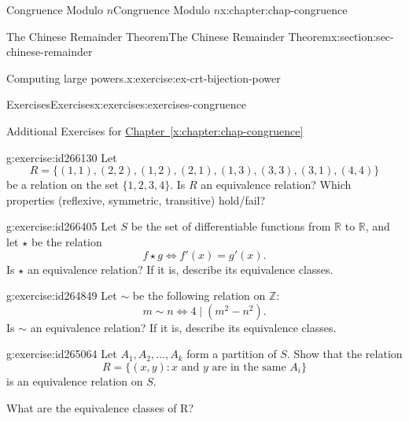 \documentclass[oneside,10pt,]{book}
\newcommand{\xreffont}{\relax}
\numberwithin{equation}{section}
\begin{document}
\begin{chapterptx}{Congruence Modulo \(n\)}{}{Congruence Modulo \(n\)}{}{}{x:chapter:chap-congruence}
\begin{sectionptx}{The Chinese Remainder Theorem}{}{The Chinese Remainder Theorem}{}{}{x:section:sec-chinese-remainder}
\begin{inlineexercise}{Computing large powers.}{x:exercise:ex-crt-bijection-power}
\end{inlineexercise}
\end{sectionptx}
%
%
\typeout{************************************************}
\typeout{************************************************}
%
\begin{exercises-section}{Exercises}{}{Exercises}{}{}{x:exercises:exercises-congruence}
\begin{introduction}{}%
Additional Exercises for \hyperref[x:chapter:chap-congruence]{Chapter~{\xreffont\ref{x:chapter:chap-congruence}}}%
\end{introduction}%
\begin{divisionexercise}{1}{}{}{g:exercise:id266130}%
Let%
\begin{equation*}
R = \{(1,1),(2,2),(1,2),(2,1),(1,3),(3,3),(3,1),(4,4)\}
\end{equation*}
be a relation on the set \(\{1,2,3,4\}\). Is \(R\) an equivalence relation? Which properties (reflexive, symmetric, transitive) hold\slash{}fail?%
\end{divisionexercise}%
\begin{divisionexercise}{2}{}{}{g:exercise:id266405}%
Let \(S\) be the set of differentiable functions from \(\mathbb{R}\) to \(\mathbb{R}\), and let \(\star\) be the relation%
\begin{equation*}
f \star g \Leftrightarrow f'(x) = g'(x)\text{.}
\end{equation*}
Is \(\star\) an equivalence relation? If it is, describe its equivalence classes.%
\end{divisionexercise}%
\begin{divisionexercise}{3}{}{}{g:exercise:id264849}%
Let \(\sim\) be the following relation on \(\mathbb{Z}\):%
\begin{equation*}
m \sim n \Leftrightarrow 4 \mid (m^2 - n^2)\text{.}
\end{equation*}
Is \(\sim\) an equivalence relation? If it is, describe its equivalence classes.%
\end{divisionexercise}%
\begin{divisionexercise}{4}{}{}{g:exercise:id265064}%
Let \(A_1, A_2, \ldots, A_k\) form a partition of \(S\). Show that the relation%
\begin{equation*}
R = \{(x,y) : x \text{ and } y \text{ are in the same $A_i$}\}
\end{equation*}
is an equivalence relation on \(S\).%
\par
What are the equivalence classes of \textdollar{}R\textdollar{}?%

\end{divisionexercise}
\end{exercises-section}
\end{chapterptx}
\end{document}
